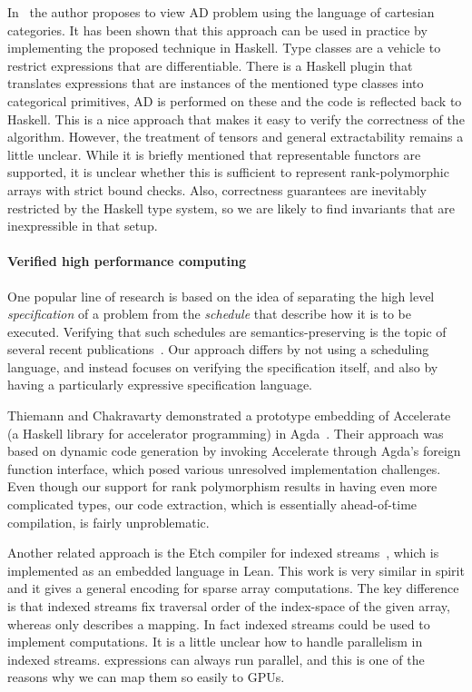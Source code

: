 In~\cite{ad-elliott} the author proposes to view AD problem using
the language of cartesian categories.  It has been shown that
this approach can be used in practice by implementing the proposed
technique in Haskell.  Type classes are a vehicle to restrict expressions
that are differentiable.  There is a Haskell plugin that translates
expressions that are instances of the mentioned type classes into
categorical primitives, AD is performed on these and the code is reflected
back to Haskell.  This is a nice approach that makes it easy
to verify the correctness of the algorithm.  However, the treatment
of tensors and general extractability remains a little unclear.
While it is briefly mentioned that representable functors
are supported, it is unclear whether this is sufficient to
represent rank-polymorphic arrays with strict bound checks.
Also, correctness guarantees are inevitably restricted by the
Haskell type system, so we are likely to find invariants that
are inexpressible in that setup.

\paragraph{Verified high performance computing}

One popular line of research is based on the idea of separating the
high level \emph{specification} of a problem from the \emph{schedule}
that describe how it is to be executed. Verifying that such schedules
are semantics-preserving is the topic of several recent
publications~\cite{10.1145/3527328,10.1145/3498717}. Our approach
differs by not using a scheduling language, and instead focuses on
verifying the specification itself, and also by having a particularly
expressive specification language.

Thiemann and Chakravarty demonstrated a prototype embedding of
Accelerate~\cite{10.1145/1926354.1926358} (a Haskell library for
accelerator programming) in Agda~\cite{thiemann2013agda}. Their
approach was based on dynamic code generation by invoking Accelerate
through Agda's foreign function interface, which posed various
unresolved implementation challenges. Even though our support for rank
polymorphism results in having even more complicated types, our code
extraction, which is essentially ahead-of-time compilation, is fairly
unproblematic.

Another related approach is the Etch compiler for indexed
streams~\cite{10.1145/3591268}, which is implemented as an embedded
language in Lean.  This work is very similar in spirit and it gives
a general encoding for sparse array computations.  The key difference
is that indexed streams fix traversal order of the index-space
of the given array, whereas  only describes a mapping.
In fact indexed streams could be used to implement 
computations.  It is a little unclear how to handle parallelism
in indexed streams.   expressions can always run parallel,
and this is one of the reasons why we can map them so easily to GPUs.


